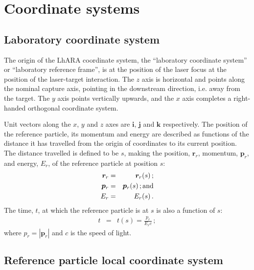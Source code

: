\graphicspath{ {02-CoordinateSystems/Figures/} }

\section{Coordinate systems}

\subsection{Laboratory coordinate system}

The origin of the LhARA coordinate system, the ``laboratory coordinate
system'' or ``laboratory reference frame'', is at the position of the
laser focus at the position of the laser-target interaction.
The $z$ axis is horizontal and points along the nominal capture axis,
pointing in the downstream direction, i.e. away from the target.
The $y$ axis points vertically upwards, and the $x$ axis completes a
right-handed orthogonal coordinate system. 

Unit vectors along the $x$, $y$ and $z$ axes are $\bm{i}$, $\bm{j}$
and $\bm{k}$ respectively.
The position of the reference particle, its momentum and energy are
described as functions of the distance it has travelled from the origin
of coordinates to its current position.
The distance travelled is defined to be $s$, making the position,
$\bm{r}_r$, momentum, $\bm{p}_r$, and energy, $E_r$, of the
reference particle at position $s$:
\begin{eqnarray}
  \bm{r}_r & = & \bm{r}_r(s)\, ;           \nonumber \\
  \bm{p}_r & = & \bm{p}_r(s)\, {\rm ; and}           \\
       E_r & = &      E_r(s)\, .           \nonumber
\end{eqnarray}
The time, $t$, at which the reference particle is at $s$ is also a
function of $s$:
\begin{eqnarray}
        t  & = & t(s) = \frac{p_r}{E_r c}\, ; 
\end{eqnarray}
where $p_r=\left|\bm{p}_r\right|$ and $c$ is the speed of light.

\subsection{Reference particle local coordinate system}

